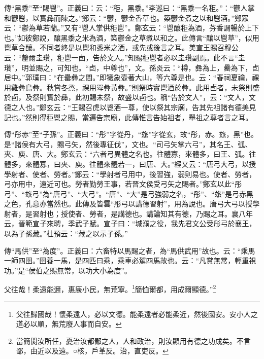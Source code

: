 {\noindent\zhuan{}\fzbyks 傳“黑黍”至“賜鬯”。正義曰：云：“秬，黑黍。”李巡曰：“黑黍一名秬。”：“鬱人掌和鬱鬯，以實彝而陳之。”鄭云：“鬱，鬱金香草也。築鬱金煮之以和鬯酒。”鄭眾云：“鬱為草若蘭。”又有“鬯人掌供秬鬯”。鄭玄云：“鬯釀秬為酒，芬香調暢於上下也。”如彼鄭說，釀黑黍之米為酒，築鬱金之草煮以和之。此傳言“釀以鬯草”，似用鬯草合釀。不同者終是以鬯和黍米之酒，或先或後言之耳。美宣王賜召穆公云：“釐爾圭瓚，秬鬯一卣，告於文人。”知賜秬鬯者必以圭瓚副焉。此不言“圭瓚”，明並賜之，可知也。“卣，中尊也”，文。孫炎云：“樽，彝為上，罍為下，卣居中。”郭璞曰：“在罍彝之間。”即犧象壺著大山，等六尊是也。云：“春祠夏禴，祼用雞彝鳥彝。秋嘗冬烝，祼用斝彝黃彝。”則祭時實鬯酒於彝。此用卣者，未祭則盛於卣，及祭則實於彝，此初賜未祭，故盛以卣也。稱“告於文人”，云：“文人，文德之人也。”鄭玄云：“王賜召虎以鬯酒一尊，使以祭其宗廟，告其先祖諸有德美見記也。”然則得秬鬯之賜，當遍告宗廟，此傳惟言告始祖者，舉祖之尊者言之耳。 \par}

{\noindent\zhuan{}\fzbyks 傳“彤赤”至“子孫”。正義曰：“彤”字從丹，“玈”字從玄，故“彤，赤。玈，黑”也。是“諸侯有大弓，賜弓矢，然後專征伐”，文也。“司弓矢掌六弓”，其名王、弧、夾、庾、唐、大。鄭玄云：“六者弓異體之名也。往體寡，來體多，曰王、弧。往體多，來體寡，曰夾、庾。往體來體若一，曰唐、大。”經又云：“唐弓大弓，以授學射者、使者、勞者。”鄭云：“學射者弓用中，後習強，弱則易也。使者、勞者，弓亦用中，遠近可也。勞者勤勞王事，若晉文侯受弓矢之賜者。”鄭玄以此“彤弓”、“玈弓”為“唐弓”、“大弓”。“唐”、“大”是弓強弱之名，“彤”、“玈”是弓赤黑之色，孔意亦當然也。此傳及皆雲“彤弓以講德習射”，用為說也。唐弓大弓以授學射者，是習射也；授使者、勞者，是講德也。講論知其有德，乃賜之耳。襄八年云，晉範宣子來聘，季武子賦。宣子曰：“城濮之役，我先君文公受彤弓於襄王，以為子孫藏。”杜預云：“藏之以示子孫。” \par}

{\noindent\zhuan{}\fzbyks 傳“馬供”至“為度”。正義曰：六畜特以馬賜之者，為“馬供武用”故也。云：“乘馬一師四圉。”圉養一馬，是四匹曰乘，乘車必駕四馬故也。云：“凡賞無常，輕重視功。”是“侯伯之賜無常，以功大小為度”。 \par}

父往哉！柔遠能邇，惠康小民，無荒寧。\footnote{父往歸國哉！懷柔遠人，必以文德。能柔遠者必能柔近，然後國安。安小人之道必以順，無荒廢人事而自安。}簡恤爾都，用成爾顯德。”\footnote{當簡閡汝所任，憂治汝都鄙之人，人和政治，則汝顯用有德之功成矣。不言鄙，由近以及遠。○核，戶革反。治，直吏反。}

